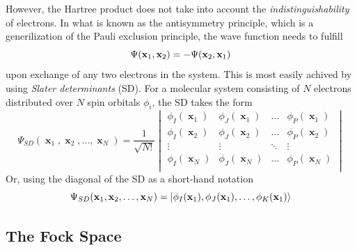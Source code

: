 However, the Hartree product does not take into account the \emph{indistinguishability} of electrons. In what is known as the antisymmetry principle, which is a generilization of the Pauli exclusion principle, the wave function needs to fulfill 
\begin{equation}
\Psi(\mathbf{x}_1,\mathbf{x}_2) = - \Psi(\mathbf{x}_2,\mathbf{x}_1) 
\end{equation}
\noindent upon exchange of any two electrons in the system. This is most easily achived by using \emph{Slater determinants} (SD). For a molecular system consisting of $N$ electrons distributed over $N$ spin orbitals $\phi_i$, the SD takes the form
\begin{equation}
\Psi_{SD}(\mbfx_1, \mbfx_2, \ldots, \mbfx_N) = \frac{1}{\sqrt{N!}}
\begin{vmatrix}
\phi_I(\mbfx_1) & \phi_J(\mbfx_1) & \ldots & \phi_P(\mbfx_1) \\
\phi_I(\mbfx_2) & \phi_J(\mbfx_2) & \ldots & \phi_P(\mbfx_2) \\
\vdots & \vdots & \ddots & \vdots \\
\phi_I(\mbfx_N) & \phi_J(\mbfx_N) & \ldots & \phi_P(\mbfx_N) \\
\end{vmatrix}
\end{equation}
\noindent Or, using the diagonal of the SD as a short-hand notation
\begin{equation}
\Psi_{SD}(\mathbf{x}_1, \mathbf{x}_2, \ldots, \mathbf{x}_N) = \ket{\phi_I(\mathbf{x}_1) , \phi_J(\mathbf{x}_1), \ldots, \phi_K(\mathbf{x}_1)}
\end{equation}

\subsection{The Fock Space}

